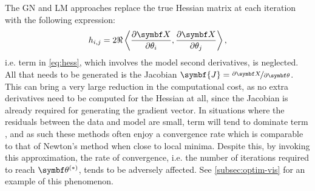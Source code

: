 The \ac{GN} and \ac{LM} approaches replace the true Hessian matrix at each
iteration with the following expression:
\begin{equation}
    h_{i,j} = 2 \Re
        \left\langle
            \frac{\partial \bX}{\partial \theta_i},
            \frac{\partial \bX}{\partial \theta_j}
        \right\rangle,
    \label{eq:hess-approx}
\end{equation}
i.e. term  in \cref{eq:hess}, which involves the model second
derivatives, is neglected. All that needs to be generated is the Jacobian
$\symbf{J} = \nicefrac{\partial \bX}{\partial \bth}$. This can
bring a very large reduction in the computational cost, as no extra
derivatives need to be computed for the Hessian at all, since the Jacobian is
already required for generating the gradient vector.
In situations where the residuals between the data and model are small, term
 will tend to dominate term , and as such these methods
often enjoy a convergence rate which is comparable to that of Newton's method
when close to local minima. Despite this, by invoking this approximation, the
rate of convergence, i.e. the number of iterations required to reach
$\bthstar$, tends to be adversely affected. See \cref{subsec:optim-vis} for an
example of this phenomenon.

